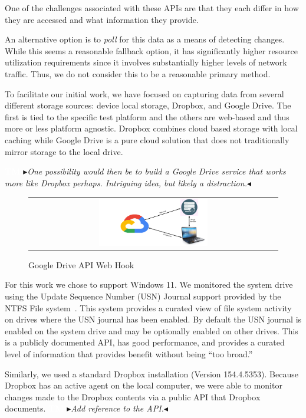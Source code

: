 \documentclass[sigconf,anonymous,review]{acmart}
\newcommand{\nbc}[3]{
 {\colorbox{#3}{\bfseries\sffamily\scriptsize\textcolor{white}{#1}}}
 {\textcolor{#3}{\sf\small$\blacktriangleright$\textit{#2}$\blacktriangleleft$}}}
\newcommand\tm[1]{\nbc{TM}{#1}{tmcolor}}
\begin{document}
One of the challenges associated with these APIs are that they each differ in
how they are accessed and what information they provide.

An alternative option is to \emph{poll} for this data as a means of detecting
changes.  While this seems a reasonable fallback option, it has significantly
higher resource utilization requirements since it involves substantially higher
levels of network traffic.  Thus, we do not consider this to be a reasonable
primary method.

To facilitate our initial work, we have focused on capturing data from several
different storage sources: device local storage, Dropbox, and Google Drive.  The
first is tied to the specific test platform and the others are web-based and
thus more or less platform agnostic.  Dropbox combines cloud based storage with
local caching while Google Drive is a pure cloud solution that does not
traditionally mirror storage to the local drive.

\tm{One possibility would then be to build a Google Drive service that works
more like Dropbox perhaps. Intriguing idea, but likely a distraction.}

\begin{figure}
    \centering
    \caption{Google Drive API Web Hook}\label{fig:google-web-hook}
    \begin{tabular}{c}
        \includegraphics[width=0.45\textwidth]{figures/google-cloud-monitor.png}
    \end{tabular}
\end{figure}

For this work we chose to support Windows 11.  We monitored the system drive
using the Update Sequence Number (USN) Journal support provided by the NTFS File
system~\cite{huang2012research}.  This system provides a curated view of file
system activity on drives where the USN journal has been enabled. By default the
USN journal is enabled on the system drive and may be optionally enabled on
other drives.  This is a publicly documented API, has good performance, and
provides a curated level of information that provides benefit without being
``too broad.''

Similarly, we used a standard Dropbox installation (Version 154.4.5353).
Because Dropbox has an active agent on the local computer, we were able to
monitor changes made to the Dropbox contents via a public API that Dropbox
documents. \tm{Add reference to the API.}
\end{document}
